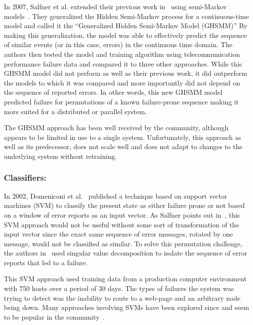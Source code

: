 In 2007, Salfner et al. extended their previous work in~\cite{salfner2006} using semi-Markov models~\cite{salfner2007}.  They generalized the Hidden Semi-Markov process for a continuous-time model and called it the ``Generalized Hidden Semi-Markov Model (GHSMM)''  By making this generalization, the model was able to effectively predict the sequence of similar events (or in this case, errors) in the continuous time domain.  The authors then tested the model and training algorithm using telecommunication performance failure data and compared it to three other approaches.  While this GHSMM model did not perform as well as their previous work, it did outperform the models to which it was compared and more importantly did not depend on the sequence of reported errors.  In other words, this new GHSMM model predicted failure for permutations of a known failure-prone sequence making it more suited for a distributed or parallel system.

The GHSMM approach has been well received by the community, although appears to be limited in use to a single system.  Unfortunately, this approach as well as its predecessor, does not scale well and does not adapt to changes to the underlying system without retraining.

\subsubsection{Classifiers:}
In 2002, Domeniconi et al.~\cite{domeniconi2002} published a technique based on support vector machines (SVM) to classify the present state as either failure prone or not based on a window of error reports as an input vector.  As Salfner points out in~\cite{salfnerSurvey}, this SVM approach would not be useful without some sort of transformation of the input vector since the exact same sequence of error messages, rotated by one message, would not be classified as similar.  To solve this permutation challenge, the authors in~\cite{domeniconi2002} used singular value decomposition to isolate the sequence of error reports that led to a failure.

This SVM approach used training data from a production computer environment with 750 hosts over a period of 30 days.  The types of failures the system was trying to detect was the inability to route to a web-page and an arbitrary node being down.  Many approaches involving SVMs have been explored since and seem to be popular in the community~\cite{fronza2013, fulp2008, murray2005, domeniconi2002, irrera2015}.

